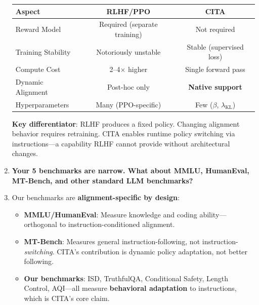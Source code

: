 \begin{enumerate}[label=\textbf{Q\arabic*.}, leftmargin=*, itemsep=8pt]
\begin{table}[H]
\centering
\small
\begin{tabular}{@{}lcc@{}}
\toprule
\textbf{Aspect} & \textbf{RLHF/PPO} & \textbf{CITA} \\
\midrule
Reward Model & Required (separate training) & Not required \\
\hline
Training Stability & Notoriously unstable & Stable (supervised loss) \\
\hline
Compute Cost & 2--4$\times$ higher & Single forward pass \\
\hline
Dynamic Alignment & Post-hoc only & \textbf{Native support} \\
\hline
Hyperparameters & Many (PPO-specific) & Few ($\beta$, $\lambda_{\text{KL}}$) \\
\bottomrule
\end{tabular}
\end{table}

\textbf{Key differentiator}: RLHF produces a fixed policy. Changing alignment behavior requires retraining. CITA enables runtime policy switching via instructions---a capability RLHF cannot provide without architectural changes.

\vspace{4mm}

\item[\ding{93}] \textbf{Your 5 benchmarks are narrow. What about MMLU, HumanEval, MT-Bench, and other standard LLM benchmarks?}

\item[\ding{224}] Our benchmarks are \textbf{alignment-specific by design}:

\begin{itemize}[leftmargin=*,itemsep=2pt]
    \item \textbf{MMLU/HumanEval}: Measure knowledge and coding ability---orthogonal to instruction-conditioned alignment.

    \item \textbf{MT-Bench}: Measures general instruction-following, not instruction-\textit{switching}. CITA's contribution is dynamic policy adaptation, not better following.

    \item \textbf{Our benchmarks}: ISD, TruthfulQA, Conditional Safety, Length Control, AQI---all measure \textbf{behavioral adaptation} to instructions, which is CITA's core claim.
\end{itemize}


\end{enumerate}
